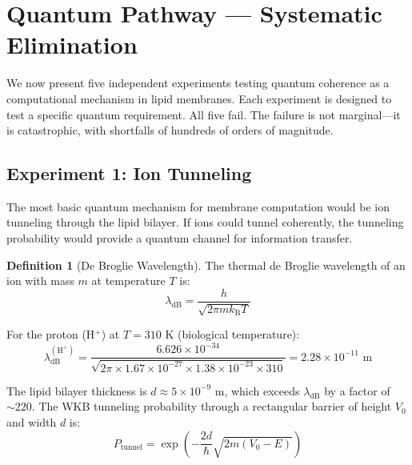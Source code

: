 \documentclass[twocolumn,10pt,a4paper]{article}
\theoremstyle{definition}
\newtheorem{definition}[theorem]{Definition}
\theoremstyle{remark}
\newcommand{\kB}{k_{\mathrm{B}}}
\begin{document}
\section{Quantum Pathway --- Systematic Elimination}
\label{sec:quantum}

We now present five independent experiments testing quantum coherence as a computational mechanism in lipid membranes. Each experiment is designed to test a specific quantum requirement. All five fail. The failure is not marginal---it is catastrophic, with shortfalls of hundreds of orders of magnitude.

\subsection{Experiment 1: Ion Tunneling}

The most basic quantum mechanism for membrane computation would be ion tunneling through the lipid bilayer. If ions could tunnel coherently, the tunneling probability would provide a quantum channel for information transfer.

\begin{definition}[De Broglie Wavelength]
\label{def:debroglie}
The thermal de Broglie wavelength of an ion with mass $m$ at temperature $T$ is:
\begin{equation}
\label{eq:debroglie}
\lambda_{\mathrm{dB}} = \frac{h}{\sqrt{2\pi m \kB T}}
\end{equation}
\end{definition}

For the proton (H$^+$) at $T = 310$ K (biological temperature):
\begin{equation}
\label{eq:proton_debroglie}
\lambda_{\mathrm{dB}}^{(\mathrm{H}^+)} = \frac{6.626 \times 10^{-34}}{\sqrt{2\pi \times 1.67 \times 10^{-27} \times 1.38 \times 10^{-23} \times 310}} = 2.28 \times 10^{-11} \text{ m}
\end{equation}

The lipid bilayer thickness is $d \approx 5 \times 10^{-9}$ m, which exceeds $\lambda_{\mathrm{dB}}$ by a factor of $\sim 220$. The WKB tunneling probability through a rectangular barrier of height $V_0$ and width $d$ is:
\begin{equation}
\label{eq:tunneling}
P_{\mathrm{tunnel}} = \exp\left(-\frac{2d}{\hbar}\sqrt{2m(V_0 - E)}\right)
\end{equation}
\end{document}
